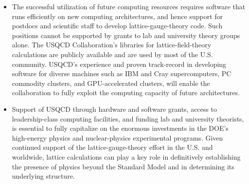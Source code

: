 \begin{itemize}
\item The successful utilization of future computing resources requires
software that runs efficiently on new computing architectures, and hence
support for postdocs and scientific staff to develop lattice-gauge-theory
code.  Such positions cannot be supported by grants to lab and university
theory groups alone.  The USQCD Collaboration's libraries for
lattice-field-theory calculations are publicly available and are used by most
of the U.S. community.  USQCD's experience and proven track-record in
developing software for diverse machines such as IBM and Cray supercomputers,
PC commodity clusters, and GPU-accelerated clusters, will enable the
collaboration to fully exploit the computing capacity of future architectures.

\item Support of USQCD through hardware and software grants, access to
leadership-class computing facilities, and funding lab and university
theorists, is essential to fully capitalize on the enormous investments in the
DOE's high-energy physics and nuclear-physics experimental programs.  Given
continued support of the lattice-gauge-theory effort in the U.S. and
worldwide, lattice calculations can play a key role in definitively
establishing the presence of physics beyond the Standard Model and in
determining its underlying structure.

\end{itemize}


